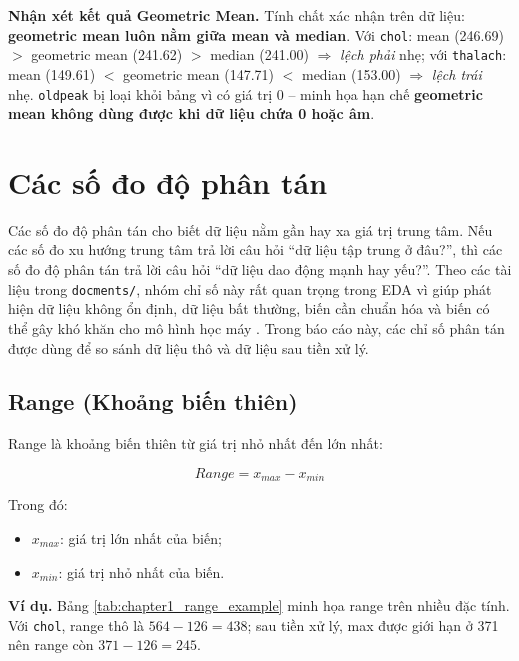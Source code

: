 \textbf{Nhận xét kết quả Geometric Mean.} Tính chất xác nhận trên dữ liệu: \textbf{geometric mean luôn nằm giữa mean và median}. Với \texttt{chol}: mean (246.69) $>$ geometric mean (241.62) $>$ median (241.00) $\Rightarrow$ \textit{lệch phải} nhẹ; với \texttt{thalach}: mean (149.61) $<$ geometric mean (147.71) $<$ median (153.00) $\Rightarrow$ \textit{lệch trái} nhẹ. \texttt{oldpeak} bị loại khỏi bảng vì có giá trị 0 -- minh họa hạn chế \textbf{geometric mean không dùng được khi dữ liệu chứa 0 hoặc âm}.

\section{Các số đo độ phân tán}

Các số đo độ phân tán cho biết dữ liệu nằm gần hay xa giá trị trung tâm. Nếu các số đo xu hướng trung tâm trả lời câu hỏi ``dữ liệu tập trung ở đâu?'', thì các số đo độ phân tán trả lời câu hỏi ``dữ liệu dao động mạnh hay yếu?''. Theo các tài liệu trong \texttt{docments/}, nhóm chỉ số này rất quan trọng trong EDA vì giúp phát hiện dữ liệu không ổn định, dữ liệu bất thường, biến cần chuẩn hóa và biến có thể gây khó khăn cho mô hình học máy \cite{Sahay2021Essentials,DeMauro2021DataAnalytics}. Trong báo cáo này, các chỉ số phân tán được dùng để so sánh dữ liệu thô và dữ liệu sau tiền xử lý.

\subsection{Range (Khoảng biến thiên)}

Range là khoảng biến thiên từ giá trị nhỏ nhất đến lớn nhất:

\begin{equation}
Range = x_{max} - x_{min}
\end{equation}

Trong đó:
\begin{itemize}[leftmargin=1.6em,label=\textbullet]
 \item $x_{max}$: giá trị lớn nhất của biến;
 \item $x_{min}$: giá trị nhỏ nhất của biến.
\end{itemize}

\textbf{Ví dụ.} Bảng \ref{tab:chapter1_range_example} minh họa range trên nhiều đặc tính. Với \texttt{chol}, range thô là $564-126=438$; sau tiền xử lý, max được giới hạn ở 371 nên range còn $371-126=245$.

